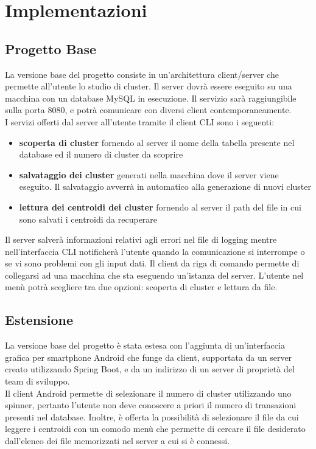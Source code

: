 \section{Implementazioni}
\subsection{Progetto Base}
\noindent La versione base del progetto consiste in un'architettura client/server che permette all'utente lo studio di cluster. Il server dovrà essere eseguito su una macchina con un database MySQL in esecuzione. 
Il servizio sarà raggiungibile sulla porta 8080, e potrà comunicare con diversi client contemporaneamente. 
\\ I servizi offerti dal server all'utente tramite il client CLI sono i seguenti:
\begin{itemize}[label=-]
  \item \textbf{scoperta di cluster} fornendo al server il nome della tabella presente nel database ed il numero di cluster da scoprire
  \item \textbf{salvataggio dei cluster} generati nella macchina dove il server viene eseguito. Il salvataggio avverrà in automatico alla generazione di nuovi cluster
  \item \textbf{lettura dei centroidi dei cluster} fornendo al server il path del file in cui sono salvati i centroidi da recuperare 
\end{itemize}
Il server salverà informazioni relativi agli errori nel file di logging mentre nell'interfaccia CLI notificherà l'utente quando la comunicazione si interrompe o se vi sono problemi con gli input dati. Il client da riga di comando permette di collegarsi ad una macchina che sta eseguendo un'istanza del server. L'utente nel menù potrà scegliere tra due opzioni: scoperta di cluster e lettura da file.

\subsection{Estensione}
\noindent La versione base del progetto è stata estesa con l'aggiunta di un'interfaccia grafica per smartphone Android che funge da client, supportata da un server creato utilizzando Spring Boot, e da un indirizzo di un server di proprietà del team di sviluppo. \\ Il client Android permette di selezionare il numero di cluster utilizzando uno spinner, pertanto l'utente non deve conoscere a priori il numero di transazioni presenti nel database. Inoltre, è offerta la possibilità di selezionare il file da cui leggere i centroidi con un comodo menù che permette di cercare il file desiderato dall'elenco dei file memorizzati nel server a cui si è connessi. 